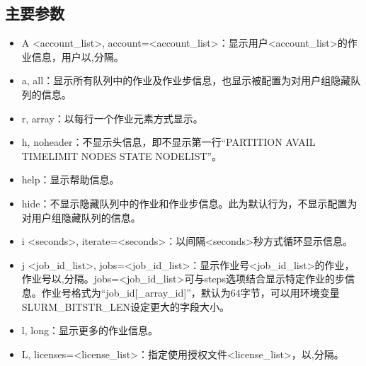 \documentclass[a4paper,12pt,english]{sphinxmanual}
\begin{document}
\subsection{主要参数}
\label{\detokenize{slurm/slurm:id11}}\label{\detokenize{slurm/slurm:id12}}\begin{itemize}
\item {} 
\sphinxAtStartPar
\sphinxhyphen{}A <account\_list>, \sphinxhyphen{}\sphinxhyphen{}account=<account\_list>：显示用户<account\_list>的作业信息，用户以,分隔。

\item {} 
\sphinxAtStartPar
\sphinxhyphen{}a, \sphinxhyphen{}\sphinxhyphen{}all：显示所有队列中的作业及作业步信息，也显示被配置为对用户组隐藏队列的信息。

\item {} 
\sphinxAtStartPar
\sphinxhyphen{}r, \sphinxhyphen{}\sphinxhyphen{}array：以每行一个作业元素方式显示。

\item {} 
\sphinxAtStartPar
\sphinxhyphen{}h, \sphinxhyphen{}\sphinxhyphen{}noheader：不显示头信息，即不显示第一行“PARTITION AVAIL TIMELIMIT NODES STATE NODELIST”。

\item {} 
\sphinxAtStartPar
\sphinxhyphen{}\sphinxhyphen{}help：显示帮助信息。

\item {} 
\sphinxAtStartPar
\sphinxhyphen{}\sphinxhyphen{}hide：不显示隐藏队列中的作业和作业步信息。此为默认行为，不显示配置为对用户组隐藏队列的信息。

\item {} 
\sphinxAtStartPar
\sphinxhyphen{}i <seconds>, \sphinxhyphen{}\sphinxhyphen{}iterate=<seconds>：以间隔<seconds>秒方式循环显示信息。

\item {} 
\sphinxAtStartPar
\sphinxhyphen{}j <job\_id\_list>, \sphinxhyphen{}\sphinxhyphen{}jobs=<job\_id\_list>：显示作业号<job\_id\_list>的作业，作业号以,分隔。\sphinxhyphen{}\sphinxhyphen{}jobs=<job\_id\_list>可与\sphinxhyphen{}\sphinxhyphen{}steps选项结合显示特定作业的步信息。作业号格式为“job\_id{[}\_array\_id{]}”，默认为64字节，可以用环境变量SLURM\_BITSTR\_LEN设定更大的字段大小。

\item {} 
\sphinxAtStartPar
\sphinxhyphen{}l, \sphinxhyphen{}\sphinxhyphen{}long：显示更多的作业信息。

\item {} 
\sphinxAtStartPar
\sphinxhyphen{}L, \sphinxhyphen{}\sphinxhyphen{}licenses=<license\_list>：指定使用授权文件<license\_list>，以,分隔。


\end{itemize}
\end{document}
